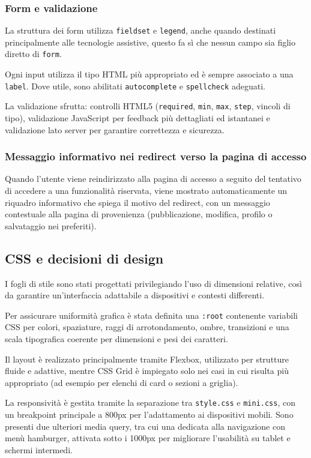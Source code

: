 \documentclass[a4paper,12pt]{article}
\begin{document}
\subsubsection{Form e validazione}
La struttura dei form utilizza \texttt{fieldset} e \texttt{legend}, anche quando destinati principalmente alle tecnologie assistive, questo fa sì che nessun campo sia figlio diretto di \texttt{form}.  

Ogni input utilizza il tipo HTML più appropriato ed è sempre associato a una \texttt{label}. Dove utile, sono abilitati \texttt{autocomplete} e \texttt{spellcheck} adeguati.

La validazione sfrutta: controlli HTML5 (\texttt{required}, \texttt{min}, \texttt{max}, \texttt{step}, vincoli di tipo), validazione JavaScript per feedback più dettagliati ed istantanei e validazione lato server per garantire correttezza e sicurezza.

\subsubsection{Messaggio informativo nei redirect verso la pagina di accesso}
Quando l’utente viene reindirizzato alla pagina di accesso a seguito del tentativo di accedere a una funzionalità riservata, viene mostrato automaticamente un riquadro informativo
che spiega il motivo del redirect, con un messaggio contestuale alla pagina di provenienza (pubblicazione, modifica, profilo o salvataggio nei preferiti).

\subsection{CSS e decisioni di design}

I fogli di stile sono stati progettati privilegiando l’uso di dimensioni relative, così da garantire un’interfaccia adattabile a dispositivi e contesti differenti.

Per assicurare uniformità grafica è stata definita una \texttt{:root} contenente variabili CSS per colori, spaziature, raggi di arrotondamento, ombre, transizioni e una scala tipografica coerente per dimensioni e pesi dei caratteri.

Il layout è realizzato principalmente tramite Flexbox, utilizzato per strutture fluide e adattive, mentre CSS Grid è impiegato solo nei casi in cui risulta più appropriato (ad esempio per elenchi di card o sezioni a griglia).

La responsività è gestita tramite la separazione tra \texttt{style.css} e \texttt{mini.css}, con un breakpoint principale a 800px per l’adattamento ai dispositivi mobili. Sono presenti due ulteriori media query, tra cui una dedicata alla navigazione con menù hamburger, attivata sotto i 1000px per migliorare l’usabilità su tablet e schermi intermedi.
\end{document}
